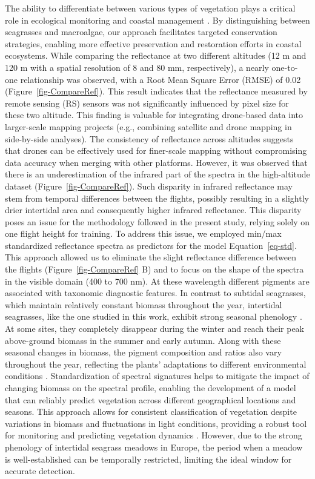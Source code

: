 \documentclass[
  number]{elsarticle}
\begin{document}
The ability to differentiate between various types of vegetation plays a
critical role in ecological monitoring and coastal management
\citep{WFD2000}. By distinguishing between seagrasses and macroalgae,
our approach facilitates targeted conservation strategies, enabling more
effective preservation and restoration efforts in coastal ecosystems.
While comparing the reflectance at two different altitudes (12 m and 120
m with a spatial resolution of 8 and 80 mm, respectively), a nearly
one-to-one relationship was observed, with a Root Mean Square Error
(RMSE) of 0.02 (Figure~\ref{fig-CompareRef}). This result indicates that
the reflectance measured by remote sensing (RS) sensors was not
significantly influenced by pixel size for these two altitude. This
finding is valuable for integrating drone-based data into larger-scale
mapping projects (e.g., combining satellite and drone mapping in
side-by-side analyses). The consistency of reflectance across altitudes
suggests that drones can be effectively used for finer-scale mapping
without compromising data accuracy when merging with other platforms.
However, it was observed that there is an underestimation of the
infrared part of the spectra in the high-altitude dataset
(Figure~\ref{fig-CompareRef}). Such disparity in infrared reflectance
may stem from temporal differences between the flights, possibly
resulting in a slightly drier intertidal area and consequently higher
infrared reflectance. This disparity poses an issue for the methodology
followed in the present study, relying solely on one flight height for
training. To address this issue, we employed min/max standardized
reflectance spectra as predictors for the model Equation~\ref{eq-std}.
This approach allowed us to eliminate the slight reflectance difference
between the flights (Figure~\ref{fig-CompareRef} B) and to focus on the
shape of the spectra in the visible domain (400 to 700 nm). At these
wavelength different pigments are associated with taxonomic diagnostic
features. In contrast to subtidal seagrasses, which maintain relatively
constant biomass throughout the year, intertidal seagrasses, like the
one studied in this work, exhibit strong seasonal phenology
\citep{davies2024sentinel}. At some sites, they completely disappear
during the winter and reach their peak above-ground biomass in the
summer and early autumn. Along with these seasonal changes in biomass,
the pigment composition and ratios also vary throughout the year,
reflecting the plants' adaptations to different environmental conditions
\citep{bargain2013seasonal, legare2022remote}. Standardization of
spectral signatures helps to mitigate the impact of changing biomass on
the spectral profile, enabling the development of a model that can
reliably predict vegetation across different geographical locations and
seasons. This approach allows for consistent classification of
vegetation despite variations in biomass and fluctuations in light
conditions, providing a robust tool for monitoring and predicting
vegetation dynamics
\citep{fyfe2003spatial, COSTA2021107018, piaser2023impact}. However, due
to the strong phenology of intertidal seagrass meadows in Europe, the
period when a meadow is well-established can be temporally restricted,
limiting the ideal window for accurate detection.
\end{document}
